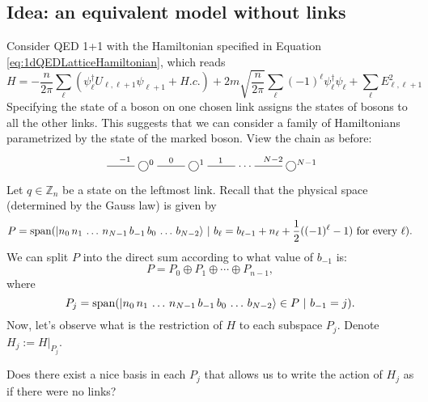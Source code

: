 	\subsection{Idea: an equivalent model without links}
	Consider QED 1+1 with the Hamiltonian specified in Equation \ref{eq:1dQEDLatticeHamiltonian}, which reads 
\[
	H=-\frac{n}{2\pi} \sum_\ell (\psi_\ell^\dagger U_{\ell,\ell+1}\psi_{\ell+1}+H.c.) + 2m\sqrt{\frac{n}{2\pi}}\sum_\ell (-1)^\ell \psi_\ell^\dagger\psi_\ell+  \sum_{\ell} E_{\ell,\ell+1}^2
\]
Specifying the state of a boson on one chosen link assigns the states of bosons to all the other links. This suggests that we can consider a family of Hamiltonians parametrized by the state of the marked boson. View the chain as before:
	\[
	\xymatrix{
	\ar@{-}[r]^{-1} & \bigcirc^0 \ar@{-}[r]^{0} &  \bigcirc^1 \ar@{-}[r]^{1} & \cdots & \ar@{-}[l]_{N-2} \bigcirc^{N-1}
	}
	\]
	Let $q \in \mathbb Z_n$ be a state on the leftmost link. Recall that the physical space (determined by the Gauss law) is given by
	\[
	P = \operatorname{span} ( |n_0\, n_1\, \ldots \, n_{N-1} \, b_{-1}\, b_0\, \ldots\, b_{N-2}\rangle \ | \ b_{\ell} =b_{\ell-1} + n_{\ell} + \frac{1}{2}((-1)^\ell-1) \ \text{for every} \ \ell).
	\]
	We can split $P$ into the direct sum according to what value of $b_{-1}$ is:
	\[
	P = P_0 \oplus P_1 \oplus \cdots \oplus P_{n-1},
	\]
	where
	\[
	P_j = \operatorname{span}( |n_0\, n_1\, \ldots \, n_{N-1} \, b_{-1}\, b_0\, \ldots\, b_{N-2}\rangle \in P \ | \ b_{-1} = j).
	\]
	Now, let's observe what is the restriction of $H$ to each subspace $P_j$. Denote $H_j := H|_{P_j}$.
\begin{idea}
Does there exist a nice basis in each $P_j$ that allows us to write the action of $H_j$ as if there were no links?
\end{idea}


